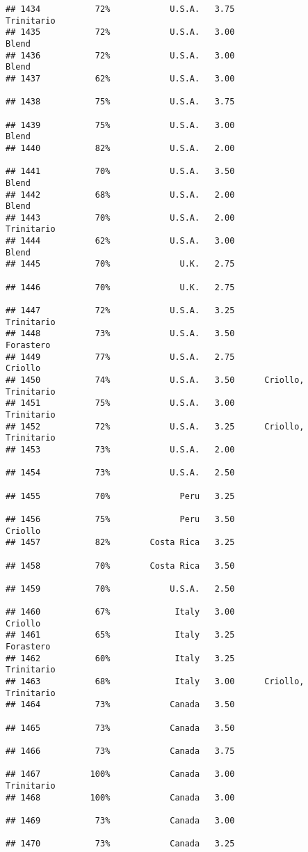 \documentclass[
]{article}
\begin{document}
\begin{verbatim}
## 1434           72%            U.S.A.   3.75               Trinitario
## 1435           72%            U.S.A.   3.00                    Blend
## 1436           72%            U.S.A.   3.00                    Blend
## 1437           62%            U.S.A.   3.00                         
## 1438           75%            U.S.A.   3.75                         
## 1439           75%            U.S.A.   3.00                    Blend
## 1440           82%            U.S.A.   2.00                         
## 1441           70%            U.S.A.   3.50                    Blend
## 1442           68%            U.S.A.   2.00                    Blend
## 1443           70%            U.S.A.   2.00               Trinitario
## 1444           62%            U.S.A.   3.00                    Blend
## 1445           70%              U.K.   2.75                         
## 1446           70%              U.K.   2.75                         
## 1447           72%            U.S.A.   3.25               Trinitario
## 1448           73%            U.S.A.   3.50                Forastero
## 1449           77%            U.S.A.   2.75                  Criollo
## 1450           74%            U.S.A.   3.50      Criollo, Trinitario
## 1451           75%            U.S.A.   3.00               Trinitario
## 1452           72%            U.S.A.   3.25      Criollo, Trinitario
## 1453           73%            U.S.A.   2.00                         
## 1454           73%            U.S.A.   2.50                         
## 1455           70%              Peru   3.25                         
## 1456           75%              Peru   3.50                  Criollo
## 1457           82%        Costa Rica   3.25                         
## 1458           70%        Costa Rica   3.50                         
## 1459           70%            U.S.A.   2.50                         
## 1460           67%             Italy   3.00                  Criollo
## 1461           65%             Italy   3.25                Forastero
## 1462           60%             Italy   3.25               Trinitario
## 1463           68%             Italy   3.00      Criollo, Trinitario
## 1464           73%            Canada   3.50                         
## 1465           73%            Canada   3.50                         
## 1466           73%            Canada   3.75                         
## 1467          100%            Canada   3.00               Trinitario
## 1468          100%            Canada   3.00                         
## 1469           73%            Canada   3.00                         
## 1470           73%            Canada   3.25                         

\end{verbatim}
\end{document}
